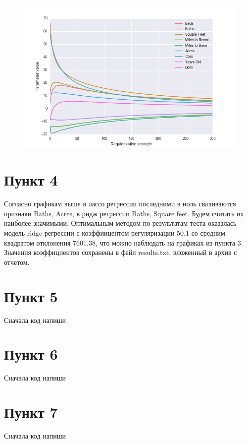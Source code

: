 \documentclass[a4paper, 12pt, oneside]{scrartcl}
\numberwithin{equation}{section}
\numberwithin{table}{section}
\numberwithin{figure}{section}
\begin{document}
\begin{figure}[H]
    \centering
    \includegraphics[width=\linewidth]{Ridge_params.png}
\end{figure}

\newpage
\section{Пункт 4}
Согласно графикам выше в лассо регрессии последними в ноль сваливаются признаки Baths, Acres, в ридж регрессии Baths, Square feet. Будем считать их 
наиболее значимыми. Оптимальным методом по результатам теста оказалась модель ridge регрессии с коэффиицентом регуляризации 50.1 со средним квадратом 
отклонения 7601.38, что можно наблюдать на графиках из пункта 3. Значения коэффициентов сохранены в файл results.txt, вложенный в архив с отчетом. 

\section{Пункт 5}
Сначала код напиши

\section{Пункт 6}
Сначала код напиши

\section{Пункт 7}
Сначала код напиши
\end{document}
